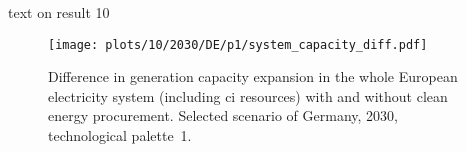 text on result 10

\begin{figure}
    \centering
    \texttt{[image: plots/10/2030/DE/p1/system\_capacity\_diff.pdf]}
    \caption{
    Difference in generation capacity expansion in the whole European electricity system (including \gls{ci} resources) with and without clean energy procurement. 
    Selected scenario of Germany, 2030, technological palette~1.}
    \label{fig:10-2030-DE-p1-system_capacity_diff.pdf}
\end{figure}
